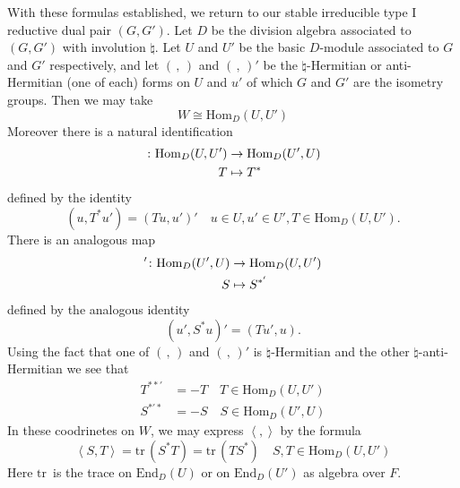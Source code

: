 \documentclass[12pt]{amsart}
\def\inn#1#2{\left\langle{#1},{#2}\right\rangle}
\def\Hom{{\mathrm{Hom}}}
\def\End{{\mathrm{End}}}
\def\inv{{\natural}}
\def\tr{{\mathrm{tr\,}}}
\begin{document}
With these formulas established, we return to our stable irreducible type I
reductive dual pair $(G,G')$. Let $D$ be the division algebra
associated to $(G,G')$ with involution $\inv$. Let $U$ and $U'$
be the basic $D$-module associated to $G$ and $G'$ respectively, 
and let $(\,,\,)$ and $(\,,\,)'$ be the $\inv$-Hermitian or
anti-Hermitian (one of each) forms on $U$ and $u'$ of 
which $G$ and $G'$ are the isometry groups. Then we may take
\begin{equation}\label{eq:20}
W\cong \Hom_D(U,U')
\end{equation}
Moreover there is a natural identification
\[
\begin{split}
\* \colon \Hom_D(U,U') &\to \Hom_D(U',U)\\
T&\mapsto T^*
\end{split}
\]
defined by the identity
\begin{equation}\label{eq:21a}
(u,T^*u') = (Tu,u')' \quad u\in U, u'\in U', T\in \Hom_D(U,U').
\end{equation}
There is an analogous map 
\[
\begin{split}
\*' \colon \Hom_D(U',U) &\to \Hom_D(U,U')\\
S&\mapsto S^{*'}
\end{split}
\]
defined by the analogous identity
\begin{equation}\label{eq:21b}
(u',S^*u)' = (Tu',u).
\end{equation}
Using the fact that one of $(\,,\,)$ and $(\,,\,)'$ is $\inv$-Hermitian and
the other $\inv$-anti-Hermitian we see that 
\begin{equation}
\begin{split}
T^{**'} &= -T \quad T\in \Hom_D(U,U')\\
S^{*'*} &= -S \quad S\in \Hom_D(U',U)
\end{split}
\end{equation}
In these coodrinetes on $W$, we may express $\inn{}{}$ by the formula 
\begin{equation}\label{eq:23}
\inn{S}{T} = \tr(S^*T) = \tr(TS^*)\quad S,T\in \Hom_D(U,U')
\end{equation}
Here $\tr$ is the trace on $\End_D(U)$ or on $\End_D(U')$ as algebra over $F$.
\end{document}

